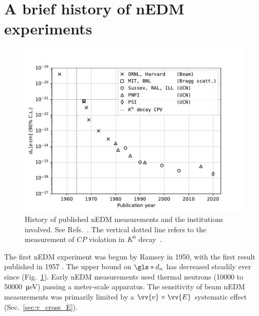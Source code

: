 
\section{A brief history of nEDM experiments}\label{sec:history_nedm}


\begin{figure}
    \centering
    \includegraphics[width=0.85 \textwidth]{figures/nEDM-history.pdf}
    \caption[History of published nEDM measurements and the institutions involved.]{History of published nEDM measurements and the institutions involved. See Refs.~\cite{ramsey_nedm_1950, ramsey_nedm_1957, miller_nedm_1967, shull_nedm_1967, dress_nedm_1968, cohen_nedm_1969, dress_nedm_1973, dress_nedm_1977, altarev_nedm_1980, altarev_nedm_1981, pendlebury_nedm_1984,
    altarev_nedm_1986, smith_nedm_1990, altarev_nedm_1992, altarev_nedm_1996, harris_nedm_1999, BAK06, ABE20, pnpi_nedm_2015}. The vertical dotted line refers to the measurement of $CP$ violation in $K^0$ decay~\cite{christenson_1964}.}
    \label{fig:nEDM-history}
\end{figure}

The first nEDM experiment was begun by Ramsey in 1950, with the first result published in 1957 \cite{ramsey_nedm_1950, ramsey_nedm_1957}. The upper bound on $\gls*{d_n}$ has decreased steadily ever since (Fig.~\ref{fig:nEDM-history}). Early nEDM measurements \cite{miller_nedm_1967, baird_nedm_1969, cohen_nedm_1969, dress_nedm_1977} used thermal neutrons (\num{10000} to \qty{50000}{\micro \eV}) passing a meter-scale apparatus. The sensitivity of beam nEDM measurements was primarily limited by a $\vv{v}\times\vv{E}$ systematic effect (Sec.~\ref{sec:v_cross_E}).

